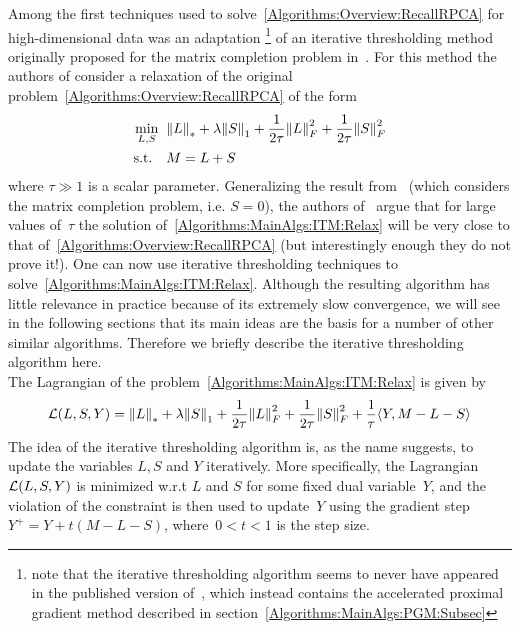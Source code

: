 \documentclass{../../common/projectreport}
\begin{document}
Among the first techniques used to solve~\eqref{Algorithms:Overview:RecallRPCA} for high-dimensional data was an adaptation \cite{Wright:2009fk}\footnote{note that the iterative thresholding algorithm seems to never have appeared in the published version of~\cite{Wright:2009fk}, which instead contains the accelerated proximal gradient method described in section~\ref{Algorithms:MainAlgs:PGM:Subsec}} of an iterative thresholding method originally proposed for the matrix completion problem in~\cite{Cai:2010uq}. For this method the authors of consider a relaxation of the original problem~\eqref{Algorithms:Overview:RecallRPCA} of the form 
%
\begin{align}
\begin{split}
\min_{L,S} \;\; &{\left\|L\right\|}_{*}^{} + \lambda {\left\|S\right\|}_{1}^{} + \frac{1}{2\tau} {\left\|L\right\|}_{F}^{2} + \frac{1}{2\tau} {\left\|S\right\|}_{F}^{2} \\
\text{s.t.} \quad &M=L+S
\end{split}
\label{Algorithms:MainAlgs:ITM:Relax}
\end{align}
%
where $\tau \gg 1$ is a scalar parameter. Generalizing the result from~\cite{Cai:2010uq} (which considers the matrix completion problem, i.e. $S=0$), the authors of~\cite{Wright:2009fk} argue that for large values of~$\tau$ the solution of~\eqref{Algorithms:MainAlgs:ITM:Relax} will be very close to that of~\eqref{Algorithms:Overview:RecallRPCA} (but interestingly enough they do not prove it!). One can now use iterative thresholding techniques to solve~\eqref{Algorithms:MainAlgs:ITM:Relax}. Although the resulting algorithm has little relevance in practice because of its extremely slow convergence, we will see in the following sections that its main ideas are the basis for a number of other similar algorithms. Therefore we briefly describe the iterative thresholding algorithm here.\\ 

The Lagrangian of the problem~\eqref{Algorithms:MainAlgs:ITM:Relax} is given by
%
\begin{align}
{\mathcal{L}}(L,S,Y) = {\left\|L\right\|}_{*}^{} + \lambda {\left\|S\right\|}_{1}^{} + \frac{1}{2\tau} {\left\|L\right\|}_{F}^{2} + \frac{1}{2\tau} {\left\|S\right\|}_{F}^{2} + \frac{1}{\tau} \langle Y, M-L-S \rangle
\label{Algorithms:MainAlgs:ITM:Lagr}
\end{align}
%
The idea of the iterative thresholding algorithm is, as the name suggests, to update the variables $L,S$ and $Y$ iteratively. More specifically, the Lagrangian ${\mathcal{L}}(L,S,Y)$ is minimized w.r.t $L$ and $S$ for some fixed dual variable~$Y$, and the violation of the constraint is then used to update~$Y$ using the gradient step~$Y^+ = Y + t (M-L-S)$, where~$0<t<1$ is the step size.\\
\end{document}

